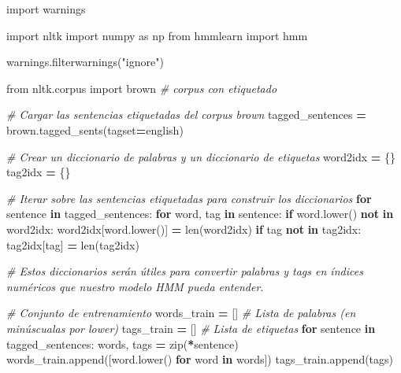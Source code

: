 \documentclass[
  a4paper,
  DIV=11,
  numbers=noendperiod]{scrreprt}
\newenvironment{Shaded}{\begin{snugshade}}{\end{snugshade}}
\newcommand{\BuiltInTok}[1]{#1}
\newcommand{\CommentTok}[1]{\textcolor[rgb]{0.56,0.35,0.01}{\textit{#1}}}
\newcommand{\ControlFlowTok}[1]{\textcolor[rgb]{0.13,0.29,0.53}{\textbf{#1}}}
\newcommand{\ImportTok}[1]{#1}
\newcommand{\KeywordTok}[1]{\textcolor[rgb]{0.13,0.29,0.53}{\textbf{#1}}}
\newcommand{\NormalTok}[1]{#1}
\newcommand{\OperatorTok}[1]{\textcolor[rgb]{0.81,0.36,0.00}{\textbf{#1}}}
\newcommand{\StringTok}[1]{\textcolor[rgb]{0.31,0.60,0.02}{#1}}
\begin{document}
\begin{Shaded}
\begin{Highlighting}[numbers=left,,]
\ImportTok{import}\NormalTok{ warnings}

\ImportTok{import}\NormalTok{ nltk}
\ImportTok{import}\NormalTok{ numpy }\ImportTok{as}\NormalTok{ np}
\ImportTok{from}\NormalTok{ hmmlearn }\ImportTok{import}\NormalTok{ hmm}

\NormalTok{warnings.filterwarnings(}\StringTok{"ignore"}\NormalTok{)}

\ImportTok{from}\NormalTok{ nltk.corpus }\ImportTok{import}\NormalTok{ brown }\CommentTok{\# corpus con etiquetado}

\CommentTok{\# Cargar las sentencias etiquetadas del corpus brown}
\NormalTok{tagged\_sentences }\OperatorTok{=}\NormalTok{ brown.tagged\_sents(tagset}\OperatorTok{=}\StringTok{\textquotesingle{}english\textquotesingle{}}\NormalTok{)}

\CommentTok{\# Crear un diccionario de palabras y un diccionario de etiquetas}
\NormalTok{word2idx }\OperatorTok{=}\NormalTok{ \{\}}
\NormalTok{tag2idx }\OperatorTok{=}\NormalTok{ \{\}}

\CommentTok{\# Iterar sobre las sentencias etiquetadas para construir los diccionarios}
\ControlFlowTok{for}\NormalTok{ sentence }\KeywordTok{in}\NormalTok{ tagged\_sentences:}
    \ControlFlowTok{for}\NormalTok{ word, tag }\KeywordTok{in}\NormalTok{ sentence:}
        \ControlFlowTok{if}\NormalTok{ word.lower() }\KeywordTok{not} \KeywordTok{in}\NormalTok{ word2idx:}
\NormalTok{            word2idx[word.lower()] }\OperatorTok{=} \BuiltInTok{len}\NormalTok{(word2idx)}
        \ControlFlowTok{if}\NormalTok{ tag }\KeywordTok{not} \KeywordTok{in}\NormalTok{ tag2idx:}
\NormalTok{            tag2idx[tag] }\OperatorTok{=} \BuiltInTok{len}\NormalTok{(tag2idx)}

\CommentTok{\# Estos diccionarios serán útiles para convertir palabras y tags en índices numéricos que nuestro modelo HMM pueda entender.}

\CommentTok{\# Conjunto de entrenamiento}
\NormalTok{words\_train }\OperatorTok{=}\NormalTok{ [] }\CommentTok{\# Lista de palabras (en minúscualas por lower)  }
\NormalTok{tags\_train }\OperatorTok{=}\NormalTok{ [] }\CommentTok{\# Lista de etiquetas}
\ControlFlowTok{for}\NormalTok{ sentence }\KeywordTok{in}\NormalTok{ tagged\_sentences:}
\NormalTok{    words, tags }\OperatorTok{=} \BuiltInTok{zip}\NormalTok{(}\OperatorTok{*}\NormalTok{sentence)}
\NormalTok{    words\_train.append([word.lower() }\ControlFlowTok{for}\NormalTok{ word }\KeywordTok{in}\NormalTok{ words])}
\NormalTok{    tags\_train.append(tags)}
\end{Highlighting}
\end{Shaded}
\end{document}

